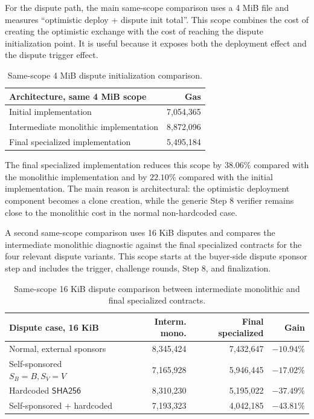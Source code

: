 For the dispute path, the main same-scope comparison uses a 4 MiB file and measures
``optimistic deploy + dispute init total''. This scope combines the cost of creating the
optimistic exchange with the cost of reaching the dispute initialization point. It is useful
because it exposes both the deployment effect and the dispute trigger effect.

\begin{table}[htbp]
  \centering
  \begin{tabularx}{\linewidth}{>{\raggedright\arraybackslash}Xr}
    \toprule
    Architecture, same 4 MiB scope & Gas \\
    \midrule
    Initial implementation & 7,054,365 \\
    Intermediate monolithic implementation & 8,872,096 \\
    Final specialized implementation & 5,495,184 \\
    \bottomrule
  \end{tabularx}
  \caption{Same-scope 4 MiB dispute initialization comparison.}
  \label{tab:same-scope-dispute-4mib}
\end{table}

The final specialized implementation reduces this scope by \(38.06\%\) compared with the
monolithic implementation and by \(22.10\%\) compared with the initial implementation. The
main reason is architectural: the optimistic deployment component becomes a clone creation,
while the generic Step 8 verifier remains close to the monolithic cost in the normal
non-hardcoded case.

A second same-scope comparison uses 16 KiB disputes and compares the intermediate monolithic
diagnostic against the final specialized contracts for the four relevant dispute variants.
This scope starts at the buyer-side dispute sponsor step and includes the trigger,
challenge rounds, Step 8, and finalization.

\begin{table}[htbp]
  \centering
  \small
  \begin{tabularx}{\linewidth}{>{\raggedright\arraybackslash}Xrrr}
    \toprule
    Dispute case, 16 KiB & Interm. mono. & Final specialized & Gain \\
    \midrule
    Normal, external sponsors & 8,345,424 & 7,432,647 & \(-10.94\%\) \\
    Self-sponsored \(S_B=B, S_V=V\) & 7,165,928 & 5,946,445 & \(-17.02\%\) \\
    Hardcoded \(\mathsf{SHA256}\) & 8,310,230 & 5,195,022 & \(-37.49\%\) \\
    Self-sponsored + hardcoded & 7,193,323 & 4,042,185 & \(-43.81\%\) \\
    \bottomrule
  \end{tabularx}
  \caption{Same-scope 16 KiB dispute comparison between intermediate monolithic and final specialized contracts.}
  \label{tab:same-scope-dispute-16kib}
\end{table}

